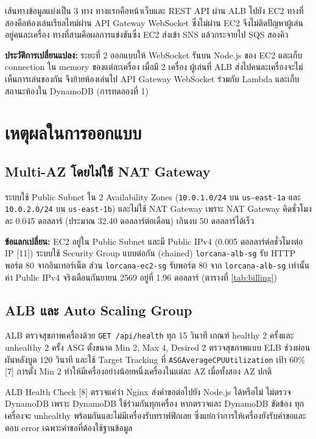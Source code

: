 เส้นทางข้อมูลแบ่งเป็น 3 ทาง ทางแรกคือหน้าเว็บและ REST API ผ่าน ALB ไปยัง EC2 ทางที่สองคือห้องเล่นเรียลไทม์ผ่าน API Gateway WebSocket ซึ่งไม่ผ่าน EC2 จึงไม่ติดปัญหาผู้เล่นอยู่คนละเครื่อง ทางที่สามคือผลการแข่งขันซึ่ง EC2 ส่งเข้า SNS แล้วกระจายไป SQS สองคิว

\textbf{ประวัติการเปลี่ยนแปลง:} ระยะที่ 2 ออกแบบให้ WebSocket รันบน Node.js ของ EC2 และเก็บ connection ใน memory ของแต่ละเครื่อง เมื่อมี 2 เครื่อง ผู้เล่นที่ ALB ส่งไปคนละเครื่องจะไม่เห็นการเล่นของกัน จึงย้ายห้องเล่นไป API Gateway WebSocket ร่วมกับ Lambda และเก็บสถานะห้องใน DynamoDB (การทดลองที่ 1)

\section{เหตุผลในการออกแบบ}

\subsection{Multi-AZ โดยไม่ใช้ NAT Gateway}

ระบบใช้ Public Subnet ใน 2 Availability Zones (\texttt{10.0.1.0/24} บน \texttt{us-east-1a} และ \texttt{10.0.2.0/24} บน \texttt{us-east-1b}) และไม่ใช้ NAT Gateway เพราะ NAT Gateway คิดชั่วโมงละ 0.045 ดอลลาร์ (ประมาณ 32.40 ดอลลาร์ต่อเดือน) เกินงบ 50 ดอลลาร์ได้เร็ว

\textbf{ข้อแลกเปลี่ยน:} EC2 อยู่ใน Public Subnet และมี Public IPv4 (0.005 ดอลลาร์ต่อชั่วโมงต่อ IP [11]) ระบบใช้ Security Group แบบต่อกัน (chained) \texttt{lorcana-alb-sg} รับ HTTP พอร์ต 80 จากอินเทอร์เน็ต ส่วน \texttt{lorcana-ec2-sg} รับพอร์ต 80 จาก \texttt{lorcana-alb-sg} เท่านั้น ค่า Public IPv4 จริงเดือนกันยายน 2569 อยู่ที่ 1.96 ดอลลาร์ (ตารางที่ \ref{tab:billing})

\subsection{ALB และ Auto Scaling Group}

ALB ตรวจสุขภาพเครื่องด้วย \texttt{GET /api/health} ทุก 15 วินาที เกณฑ์ healthy 2 ครั้งและ unhealthy 2 ครั้ง ASG ตั้งขนาด Min 2, Max 4, Desired 2 ตรวจสุขภาพแบบ ELB ช่วงผ่อนผันหลังบูต 120 วินาที และใช้ Target Tracking ที่ \texttt{ASGAverageCPUUtilization} เป้า 60\% [7] การตั้ง Min 2 ทำให้มีเครื่องอย่างน้อยหนึ่งเครื่องในแต่ละ AZ เมื่อทั้งสอง AZ ปกติ

ALB Health Check [8] ตรวจแค่ว่า Nginx ส่งคำขอต่อไปยัง Node.js ได้หรือไม่ ไม่ตรวจ DynamoDB เพราะ DynamoDB ใช้ร่วมกันทุกเครื่อง หากตรวจและ DynamoDB ขัดข้อง ทุกเครื่องจะ unhealthy พร้อมกันและไม่มีเครื่องรับทราฟฟิกเลย ซึ่งแย่กว่าการให้เครื่องยังรับคำขอและตอบ error เฉพาะคำขอที่ต้องใช้ฐานข้อมูล

